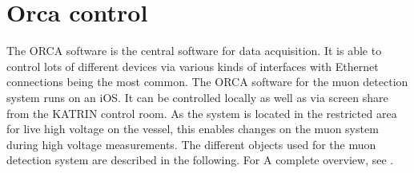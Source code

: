   \section{Orca control}
  \label{ch:The muon detection system:sec:OrcaControl}
  The ORCA software is the central software for data acquisition. It is able to control lots of different devices via various kinds of interfaces with Ethernet connections being the most common. The ORCA software for the muon detection system runs on an iOS. It can be controlled locally as well as via screen share from the KATRIN control room. As the system is located in the restricted area for live high voltage on the vessel, this enables changes on the muon system during high voltage measurements. The different objects used for the muon detection system are described in the following. For A complete overview, see \cite{norman}.

